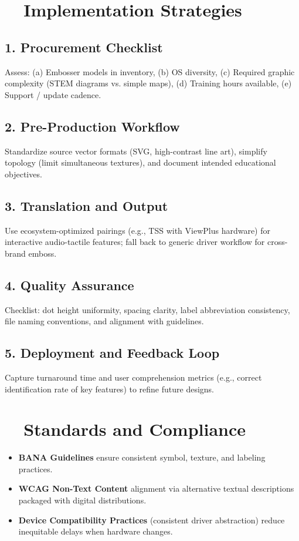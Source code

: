 \section{~~Implementation Strategies}\label{ch14:sec:implementation-strategies}
\subsection*{1. Procurement Checklist}
Assess: (a) Embosser models in inventory, (b) OS diversity, (c) Required graphic complexity (STEM diagrams vs. simple maps), (d) Training hours available, (e) Support / update cadence.
\subsection*{2. Pre-Production Workflow}
Standardize source vector formats (SVG, high-contrast line art), simplify topology (limit simultaneous textures), and document intended educational objectives.
\subsection*{3. Translation and Output}
Use ecosystem-optimized pairings (e.g., TSS with ViewPlus hardware) for interactive audio-tactile features; fall back to generic driver workflow for cross-brand emboss.
\subsection*{4. Quality Assurance}
Checklist: dot height uniformity, spacing clarity, label abbreviation consistency, file naming conventions, and alignment with  guidelines.
\subsection*{5. Deployment and Feedback Loop}
Capture turnaround time and user comprehension metrics (e.g., correct identification rate of key features) to refine future designs.

\section{~~Standards and Compliance}\label{ch14:sec:standards-compliance}
\begin{itemize}
	\item \textbf{BANA  Guidelines} ensure consistent symbol, texture, and labeling practices\supercite{CreatingTactileGraphics}.
	\item \textbf{WCAG Non-Text Content} alignment via alternative textual descriptions packaged with digital distributions\supercite{WCAG21LevelAA}.
	\item \textbf{Device Compatibility Practices} (consistent driver abstraction) reduce inequitable delays when hardware changes.
\end{itemize}

